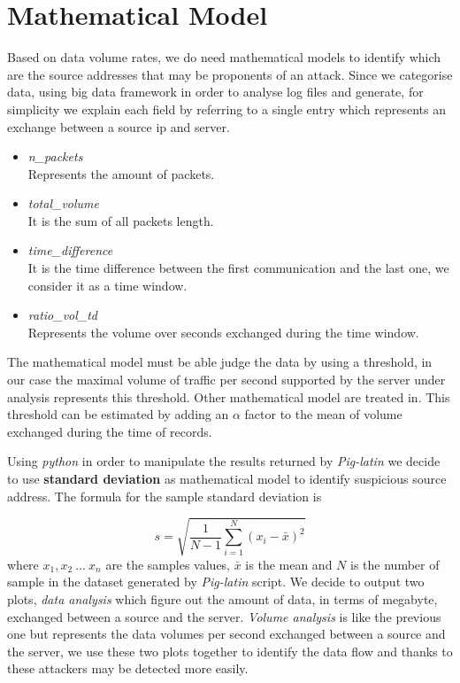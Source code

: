 \section{Mathematical Model}
Based on data volume rates, we do need mathematical models to identify which are the source addresses that may be proponents of an attack. Since we categorise data, using big data framework in order to analyse log files and generate, for simplicity we explain each field by referring to a single entry which represents an exchange between a source ip and server.

\begin{itemize}
	\item \textit{n\_packets} \\ Represents the amount of packets.
	\item \textit{total\_volume} \\ It is the sum of all packets length.
	\item \textit{time\_difference} \\ It is the time difference between the first communication and the last one, we consider it as a time window.
	\item \textit{ratio\_vol\_td} \\ Represents the volume over seconds exchanged during the time window.
\end{itemize}

The mathematical model must be able judge the data by using a threshold, in our case the maximal volume of traffic per second supported by the server under analysis represents this threshold. Other mathematical model are treated in\cite{detection_by_path_analaysis}. 
This threshold can be estimated by adding an $\alpha$ factor to the mean of volume exchanged during the time of records.

Using \textit{python} in order to manipulate the results returned by \textit{Pig-latin} we decide to use \textbf{standard deviation} as mathematical model to identify suspicious source address.
The formula for the sample standard deviation is

\begin{equation}
\label{eq:standard_dev}
	s = \sqrt{\frac{1}{N-1}\sum_{i=1}^N(x_i - \bar{x})^2}
\end{equation}
where $x_1, x_2\ ...\ x_n$ are the samples values, $\bar{x}$ is the mean and $N$ is the number of sample in the dataset generated by \textit{Pig-latin} script. We decide to output two plots, \textit{data analysis} which figure out the amount of data, in terms of megabyte, exchanged between a source and the server. \textit{Volume analysis} is like the previous one but represents the data volumes per second exchanged between a source and the server, we use these two plots together to identify the data flow and thanks to these attackers may be detected more easily.
